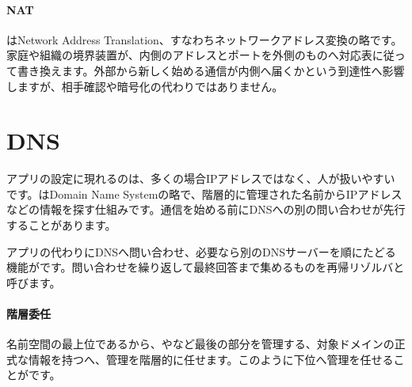 \paragraph{NAT}
        はNetwork Address Translation、すなわちネットワークアドレス変換の略です。家庭や組織の境界装置が、内側のアドレスとポートを外側のものへ対応表に従って書き換えます。外部から新しく始める通信が内側へ届くかという到達性へ影響しますが、相手確認や暗号化の代わりではありません。

\par
\endgroup
\par
\endgroup


\section{DNS}
\label{sec:05-network-08}

アプリの設定に現れるのは、多くの場合IPアドレスではなく、人が扱いやすいです。はDomain Name Systemの略で、階層的に管理された名前からIPアドレスなどの情報を探す仕組みです。通信を始める前にDNSへの別の問い合わせが先行することがあります。

アプリの代わりにDNSへ問い合わせ、必要なら別のDNSサーバーを順にたどる機能がです。問い合わせを繰り返して最終回答まで集めるものを再帰リゾルバと呼びます。

\begingroup
  \centering
  \vspace{3mm}
\begingroup
\paragraph{階層委任}
        名前空間の最上位であるから、やなど最後の部分を管理する、対象ドメインの正式な情報を持つへ、管理を階層的に任せます。このように下位へ管理を任せることがです。

